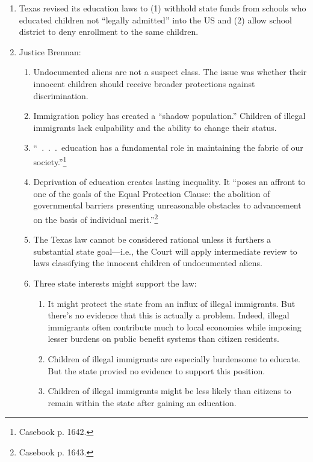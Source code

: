\begin{enumerate}
    \item Texas revised its education laws to (1) withhold state funds from 
    schools who educated children not ``legally admitted'' into the US and (2) 
    allow school district to deny enrollment to the same children.
    \item Justice Brennan:
    \begin{enumerate}
        \item Undocumented aliens are not a suspect class. The issue was 
        whether their innocent children should receive broader protections 
        against discrimination.
        \item Immigration policy has created a ``shadow population.'' Children 
        of illegal immigrants lack culpability and the ability to change their 
        status.
        \item ``~.~.~.~education has a fundamental role in maintaining the 
        fabric of our society.''\footnote{Casebook p. 1642.}
        \item Deprivation of education creates lasting inequality. It ``poses 
        an affront to one of the goals of the Equal Protection Clause: the 
        abolition of governmental barriers presenting unreasonable obstacles 
        to advancement on the basis of individual merit.''\footnote{Casebook 
        p. 1643.}
        \item The Texas law cannot be considered rational unless it furthers a 
        substantial state goal---i.e., the Court will apply intermediate 
        review to laws classifying the innocent children of undocumented 
        aliens.
        \item Three state interests might support the law:
        \begin{enumerate}
            \item It might protect the state from an influx of illegal 
            immigrants. But there's no evidence that this is actually a 
            problem. Indeed, illegal immigrants often contribute much to local 
            economies while imposing lesser burdens on public benefit systems 
            than citizen residents.
            \item Children of illegal immigrants are especially burdensome to 
            educate. But the state provied no evidence to support this 
            position.
            \item Children of illegal immigrants might be less likely than 
            citizens to remain within the state after gaining an education. 

\end{enumerate}
\end{enumerate}
\end{enumerate}
